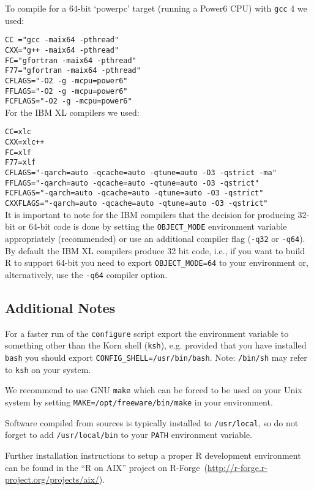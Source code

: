 \documentclass[a4paper]{report}
\newcommand{\code}[1]{\mbox{\texttt{#1}}}
\newcommand{\proglang}[1]{\textsf{#1}}
\begin{document}
To compile for a 64-bit `powerpc' target (running a Power6 CPU) with
\code{gcc} 4 we used:

\code{CC ="gcc -maix64 -pthread"}\\
\code{CXX="g++ -maix64 -pthread"}\\
\code{FC="gfortran -maix64 -pthread"}\\
\code{F77="gfortran -maix64 -pthread"}\\
\code{CFLAGS="-O2 -g -mcpu=power6"}\\
\code{FFLAGS="-O2 -g -mcpu=power6"}\\
\code{FCFLAGS="-O2 -g -mcpu=power6"}\\

For the IBM XL compilers we used:

\code{CC=xlc}\\
\code{CXX=xlc++}\\
\code{FC=xlf}\\
\code{F77=xlf}\\
\code{CFLAGS="-qarch=auto -qcache=auto -qtune=auto -O3 -qstrict -ma"}\\
\code{FFLAGS="-qarch=auto -qcache=auto -qtune=auto -O3 -qstrict"}\\
\code{FCFLAGS="-qarch=auto -qcache=auto -qtune=auto -O3 -qstrict"}\\
\code{CXXFLAGS="-qarch=auto -qcache=auto -qtune=auto -O3 -qstrict"}\\

It is important to note for the IBM compilers that the decision
for producing 32-bit or 64-bit code is done by setting the
\code{OBJECT\_MODE} environment variable appropriately (recommended) or
use an additional compiler flag (\code{-q32} or \code{-q64}). By
default the IBM XL compilers produce 32 bit code, i.e., if you want to
build \proglang{R} to support 64-bit you need to export
\code{OBJECT\_MODE=64} to your environment or, alternatively, use the
\code{-q64} compiler option.

\subsection{Additional Notes}

For a faster run of the \code{configure} script export the environment
variable to something other than the Korn shell (\code{ksh}),
e.g. provided that you have installed \code{bash} you should export
\code{CONFIG\_SHELL=/usr/bin/bash}. Note: \code{/bin/sh} may refer to
\code{ksh} on your system. 


We recommend to use GNU \code{make} which can be forced to be used on
your Unix system by setting \code{MAKE=/opt/freeware/bin/make} in your
environment. 


Software compiled from sources is typically installed to
\code{/usr/local}, so do not forget to add \code{/usr/local/bin} to
your \code{PATH} environment variable.

Further installation instructions to setup a proper
\proglang{R} development environment can be found in the ``R on AIX''
project on R-Forge~(\url{http://r-forge.r-project.org/projects/aix/}).
\end{document}
